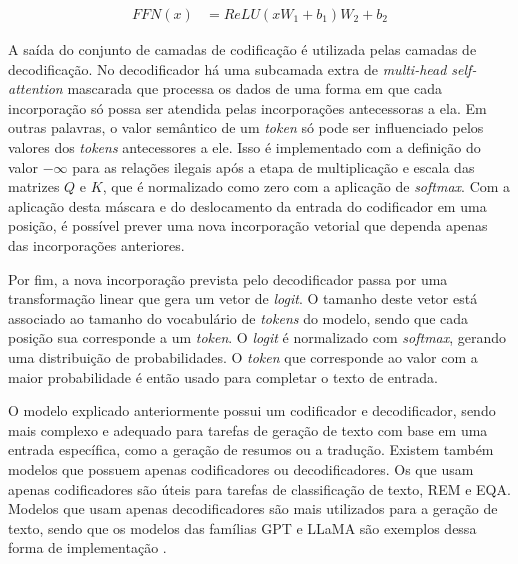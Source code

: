 \begin{align*}
    FFN(x) & = ReLU(xW_1+b_1)W_2 + b_2
\end{align*}

A saída do conjunto de camadas de codificação é utilizada pelas camadas de decodificação. No decodificador há uma
subcamada extra de \textit{multi-head self-attention} mascarada que processa os dados de uma forma em que cada
incorporação só possa ser atendida pelas incorporações antecessoras a ela. Em outras palavras, o valor semântico de um
\textit{token} só pode ser influenciado pelos valores dos \textit{tokens} antecessores a ele. Isso é implementado com a
definição do valor
\begin{math}-\infty\end{math} para as relações ilegais após a etapa de multiplicação e escala das matrizes \begin{math}Q\end{math} e \begin{math}K\end{math}, que é
normalizado como zero com a aplicação de \textit{softmax}. Com a aplicação desta máscara e do deslocamento da entrada do codificador em uma posição, é possível prever
uma nova incorporação vetorial que dependa apenas das incorporações anteriores.

Por fim, a nova incorporação prevista pelo decodificador passa por uma transformação linear que gera um vetor de
\textit{logit}. O tamanho deste vetor está associado ao tamanho do vocabulário de \textit{tokens} do modelo, sendo que
cada posição sua corresponde a um \textit{token}. O \textit{logit} é normalizado com \textit{softmax}, gerando uma
distribuição de probabilidades. O \textit{token} que corresponde ao valor com a maior probabilidade é então usado para
completar o texto de entrada.


O modelo explicado anteriormente possui um codificador e decodificador, sendo mais complexo e adequado para tarefas de
geração de texto com base em uma entrada específica, como a geração de resumos ou a tradução. Existem também modelos
que possuem apenas codificadores ou decodificadores. Os que usam apenas codificadores são úteis para tarefas de
classificação de texto, \ac{REM} e \ac{EQA}. Modelos que usam apenas decodificadores são mais utilizados para a geração
de texto, sendo que os modelos das famílias \ac{GPT} e \ac{LLaMA} são exemplos dessa forma de implementação
\cite{llm_survey_2024}.

